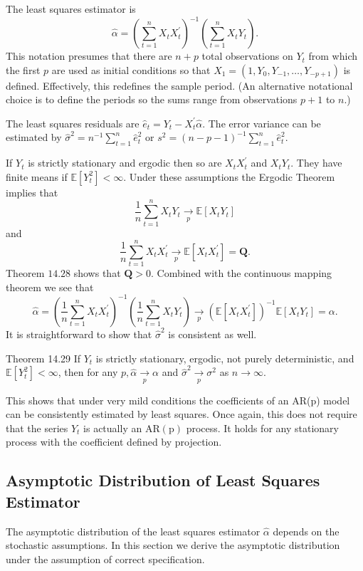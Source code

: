 \documentclass[10pt]{article}
\begin{document}
The least squares estimator is
$$
\widehat{\alpha}=\left(\sum_{t=1}^{n} X_{t} X_{t}^{\prime}\right)^{-1}\left(\sum_{t=1}^{n} X_{t} Y_{t}\right) .
$$
This notation presumes that there are $n+p$ total observations on $Y_{t}$ from which the first $p$ are used as initial conditions so that $X_{1}=\left(1, Y_{0}, Y_{-1}, \ldots, Y_{-p+1}\right)$ is defined. Effectively, this redefines the sample period. (An alternative notational choice is to define the periods so the sums range from observations $p+1$ to $n$.)

The least squares residuals are $\widehat{e}_{t}=Y_{t}-X_{t}^{\prime} \widehat{\alpha}$. The error variance can be estimated by $\widehat{\sigma}^{2}=n^{-1} \sum_{t=1}^{n} \widehat{e}_{t}^{2}$ or $s^{2}=(n-p-1)^{-1} \sum_{t=1}^{n} \widehat{e}_{t}^{2}$.

If $Y_{t}$ is strictly stationary and ergodic then so are $X_{t} X_{t}^{\prime}$ and $X_{t} Y_{t}$. They have finite means if $\mathbb{E}\left[Y_{t}^{2}\right]<\infty$. Under these assumptions the Ergodic Theorem implies that
$$
\frac{1}{n} \sum_{t=1}^{n} X_{t} Y_{t} \underset{p}{\longrightarrow} \mathbb{E}\left[X_{t} Y_{t}\right]
$$
and
$$
\frac{1}{n} \sum_{t=1}^{n} X_{t} X_{t}^{\prime} \underset{p}{\longrightarrow} \mathbb{E}\left[X_{t} X_{t}^{\prime}\right]=\boldsymbol{Q} .
$$
Theorem $14.28$ shows that $\boldsymbol{Q}>0$. Combined with the continuous mapping theorem we see that
$$
\widehat{\alpha}=\left(\frac{1}{n} \sum_{t=1}^{n} X_{t} X_{t}^{\prime}\right)^{-1}\left(\frac{1}{n} \sum_{t=1}^{n} X_{t} Y_{t}\right) \underset{p}{\longrightarrow}\left(\mathbb{E}\left[X_{t} X_{t}^{\prime}\right]\right)^{-1} \mathbb{E}\left[X_{t} Y_{t}\right]=\alpha .
$$
It is straightforward to show that $\widehat{\sigma}^{2}$ is consistent as well.

Theorem 14.29 If $Y_{t}$ is strictly stationary, ergodic, not purely deterministic, and $\mathbb{E}\left[Y_{t}^{2}\right]<\infty$, then for any $p, \widehat{\alpha} \underset{p}{\longrightarrow} \alpha$ and $\widehat{\sigma}^{2} \underset{p}{\longrightarrow} \sigma^{2}$ as $n \rightarrow \infty$.

This shows that under very mild conditions the coefficients of an AR(p) model can be consistently estimated by least squares. Once again, this does not require that the series $Y_{t}$ is actually an $\mathrm{AR}(\mathrm{p})$ process. It holds for any stationary process with the coefficient defined by projection.

\subsection{Asymptotic Distribution of Least Squares Estimator}
The asymptotic distribution of the least squares estimator $\widehat{\alpha}$ depends on the stochastic assumptions. In this section we derive the asymptotic distribution under the assumption of correct specification.
\end{document}

